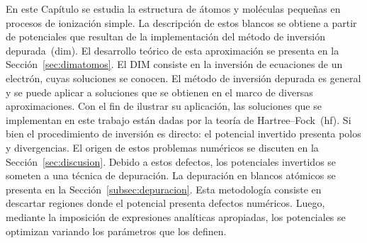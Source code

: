 En este Capítulo se estudia la estructura de átomos y moléculas pequeñas
en procesos de ionización simple. La descripción de estos blancos se 
obtiene a partir de potenciales que resultan de la implementación del 
método de inversión depurada~(\acs{dim}). El desarrollo teórico de esta
aproximación se presenta en la Sección~\ref{sec:dimatomos}. El DIM 
consiste en la inversión de ecuaciones de un electrón, cuyas soluciones 
se conocen. El método de inversión depurada es general y se puede 
aplicar a soluciones que se obtienen en el marco de diversas 
aproximaciones. Con el fin de ilustrar su aplicación, las soluciones que 
se implementan en este trabajo están dadas por la teoría de 
Hartree--Fock~(\acs{hf}). Si bien el procedimiento de inversión es 
directo: el potencial invertido presenta polos y divergencias. El origen 
de estos problemas numéricos se discuten en la 
Sección~\ref{sec:discusion}. Debido a estos defectos, los potenciales 
invertidos se someten a una técnica de depuración. La depuración en 
blancos atómicos se presenta en la Sección~\ref{subsec:depuracion}. Esta 
metodología consiste en descartar regiones donde el potencial presenta 
defectos numéricos. Luego, mediante la imposición de expresiones 
analíticas apropiadas, los potenciales se optimizan variando los 
parámetros que los definen.
